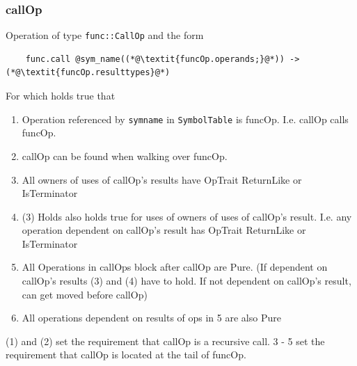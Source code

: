 \documentclass{article}
\begin{document}
\subsubsection{callOp}
Operation of type \texttt{func::CallOp} and the form 
\begin{lstlisting}
    func.call @sym_name((*@\textit{funcOp.operands;}@*)) -> (*@\textit{funcOp.resulttypes}@*)
\end{lstlisting}
For which holds true that 
\begin{enumerate}
    \item Operation referenced by \texttt{sym\textunderscore name} in \texttt{SymbolTable} is funcOp. I.e. callOp calls funcOp.
    \item callOp can be found when walking over funcOp. 
    \item All owners of uses of callOp's results have OpTrait ReturnLike or IsTerminator
    \item (3) Holds also holds true for uses of owners of uses of callOp's result. I.e. any operation dependent on callOp's result has OpTrait ReturnLike or IsTerminator
    \item All Operations in callOps block after callOp are Pure. (If dependent on callOp's results (3) and (4) have to hold. If not dependent on callOp's result, can get moved before callOp)
    \item All operations dependent on results of ops in 5 are also Pure
\end{enumerate}

(1) and (2) set the requirement that callOp is a recursive call. 3 - 5 set the requirement that 
callOp is located at the tail of funcOp.




\end{document}
